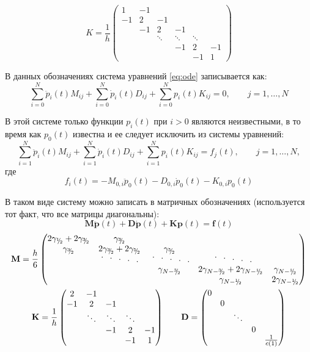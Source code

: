 \documentclass[12pt]{article}
\newcommand{\cutefrac}[2]{{}^{#1\!}\!/{\!}_#2}
\newcommand{\half}{\cutefrac{1}{2}}
\newcommand{\cuteddots}{
\text{
\raisebox{.6ex}{$\cdot$}\hspace{.75em}%
\raisebox{.3ex}{$\cdot$}\hspace{.75em}%
$\cdot$\hspace{.75em}%
\raisebox{-.3ex}{$\cdot$}\hspace{.75em}%
\raisebox{-.6ex}{$\cdot$}%
}}
\begin{document}
\[
K = \frac{1}{h}
\begin{pmatrix}
1 & -1 & \\
-1 & 2 & -1\\
& -1 & 2 & -1\\
& & \ddots & \ddots & \ddots \\
& & & -1 & 2 & -1\\
& & & & -1 & 1
\end{pmatrix}
\]

В данных обозначениях система уравнений \eqref{eq:ode} записывается как:
\[
\sum_{i=0}^N \ddot p_i(t) M_{ij} 
+ \sum_{i=0}^N \dot p_i(t) D_{ij} 
+ \sum_{i=0}^N p_i(t) K_{ij} = 0, \qquad j = 1, \dots,
N
\]

В этой системе только функции $p_i(t)$ при $i > 0$ являются  неизвестными, в то
время как $p_0(t)$ известна и ее следует исключить из системы уравнений:
\[
\sum_{i=1}^N \ddot p_i(t) M_{ij} 
+ \sum_{i=1}^N \dot p_i(t) D_{ij} 
+ \sum_{i=1}^N p_i(t) K_{ij} = f_j(t), \qquad j = 1, \dots,
N,
\]
где 
\[f_i(t) = -M_{0,i} \ddot p_0(t) -D_{0,i} \dot p_0(t) -K_{0,i} p_0(t)\]

В таком виде систему можно записать в матричных обозначениях
(используется тот факт, что все матрицы диагональны):
\begin{equation}
\mathbf{M} \ddot{\mathbf{p}}(t) + \mathbf{D} \dot{\mathbf{p}}(t)
+ \mathbf{K} \mathbf{p}(t) = \mathbf{f}(t)
\label{eq:vector}
\end{equation}
\begin{gather*}
\mathbf{M} = 
\frac{h}{6}
\begin{pmatrix}
2\gamma_{\half} + 2\gamma_{\cutefrac{3}{2}} & \gamma_{\cutefrac{3}{2}}\\
\gamma_{\cutefrac{3}{2}} & 2\gamma_{\cutefrac{3}{2}} + 2\gamma_{\cutefrac{5}{2}} & \gamma_{\cutefrac{5}{2}}\\
& \cuteddots\; & \cuteddots & \;\cuteddots \\
& & \gamma_{N - \cutefrac{3}{2}} & 2\gamma_{N - \cutefrac{3}{2}} + 2\gamma_{N
- \half} & \gamma_{N-\half}\\
& & & \gamma_{N - \half} & 2\gamma_{N-\half}
\end{pmatrix}
\\
\mathbf{K} = 
\frac{1}{h}
\begin{pmatrix}
2 & -1\\
-1 & 2 & -1\\
& \ddots & \ddots & \ddots \\
& & -1 & 2 & -1\\
& & & -1 & 1
\end{pmatrix}\qquad
\mathbf{D} = 
\begin{pmatrix}
0  \\
& 0 \\
& & \ddots \\
& & & 0 \\
& & & & \frac{1}{c(1)}
\end{pmatrix}
\end{gather*}
\end{document}
